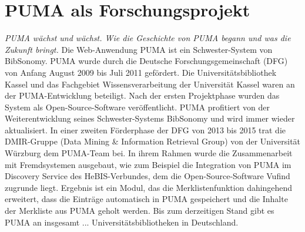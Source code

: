 \section{PUMA als Forschungsprojekt}
\textit{PUMA wächst und wächst. Wie die Geschichte von PUMA begann und was die Zukunft bringt.}
\newline
\newline
Die Web-Anwendung PUMA ist ein Schwester-System von BibSonomy.  PUMA wurde durch die Deutsche Forschungsgemeinschaft (DFG) von Anfang August 2009 bis Juli 2011 gefördert. Die Universitätsbibliothek Kassel und das Fachgebiet Wissensverarbeitung der Universität Kassel waren an der PUMA-Entwicklung beteiligt. Nach der ersten Projektphase wurden das System als Open-Source-Software veröffentlicht. PUMA profitiert von der Weiterentwicklung seines Schwester-Systems BibSonomy und wird immer wieder aktualisiert. In einer zweiten Förderphase der DFG von 2013 bis 2015 trat die DMIR-Gruppe (Data Mining \& Information Retrieval Group) von der Universität Würzburg dem PUMA-Team bei. In ihrem Rahmen wurde die Zusammenarbeit mit Fremdsystemen ausgebaut, wie zum Beispiel die Integration von PUMA im Discovery Service des HeBIS-Verbundes, dem die Open-Source-Software Vufind zugrunde liegt. Ergebnis ist ein Modul, das die Merklistenfunktion dahingehend erweitert, dass die Einträge automatisch in PUMA gespeichert und die Inhalte der Merkliste aus PUMA geholt werden. Bis zum derzeitigen Stand gibt es PUMA an insgesamt ... Universitätsbibliotheken in Deutschland.